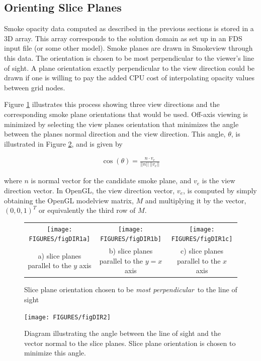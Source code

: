 {%

\subsection{Orienting Slice Planes}

Smoke opacity data computed as described in the previous sections is stored in a 3D array. This array corresponds to the solution domain as set up in an FDS input file (or some other model). Smoke planes are drawn in Smokeview through this data.  The orientation is chosen to be most perpendicular to the viewer's line of sight. A plane orientation exactly perpendicular to the view direction could be drawn if one is willing to pay the added CPU cost of interpolating opacity values between grid nodes.

Figure \ref{figDIRA} illustrates this process showing three view directions and the corresponding smoke plane orientations that would be used. Off-axis viewing is minimized by selecting the view planes orientation that minimizes the angle between the planes normal direction and the view direction. This angle, $\theta$, is illustrated in Figure \ref{figDIRB}, and is given by

\begin{eqnarray*}
\cos(\theta)=\frac{n\cdot v_e}{||n||~||v_e||}
\end{eqnarray*}

\noindent where $n$ is normal vector for the candidate smoke plane, and $v_e$ is the view direction vector.  In OpenGL, the view direction vector, $v_e$, is computed by simply obtaining the OpenGL modelview matrix, $M$ and multiplying it by the vector, $(0,0,1)^T$ or equivalently the third row of $M$.

\begin{figure}
\begin{tabular}{ccc}
\texttt{[image: FIGURES/figDIR1a]}&
\texttt{[image: FIGURES/figDIR1b]}&
\texttt{[image: FIGURES/figDIR1c]}\\
a) slice planes parallel to the $y$ axis& b) slice planes parallel to
the $y=x$ axis&
c) slice planes parallel to the $x$ axis\\
\end{tabular}
\caption{Slice plane orientation chosen to be {\em most perpendicular}\ to the line of sight }
\label{figDIRA}
\end{figure}

\begin{figure}
\centerline{\texttt{[image: FIGURES/figDIR2]}}
\caption[Diagram illustrating the angle between the line of sight
and the vector normal to the slice planes.]{Diagram illustrating the angle between the line of sight
and the vector normal to the slice planes.  Slice plane orientation is chosen to minimize
this angle.} \label{figDIRB}
\end{figure}

}
